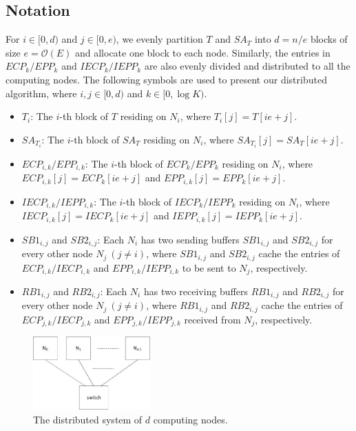 \documentclass{llncs}
\begin{document}
\subsection{Notation}

For $i\in [0,d)$ and $j\in [0,e)$, we evenly partition $T$ and $SA_T$ into $d=n/e$ blocks of size $e=\mathcal{O}(E)$ and allocate one block to each node. Similarly, the entries in $ECP_k/EPP_k$ and $IECP_k/IEPP_k$ are also evenly divided and distributed to all the computing nodes. The following symbols are used to present our distributed algorithm, where $i,j\in [0,d)$ and $k\in [0,\log K)$.

\begin{itemize}
\item $T_i$: The $i$-th block of $T$ residing on $N_i$, where $T_i[j] = T[ie+j]$.
\item $SA_{T_i}$: The $i$-th block of $SA_T$ residing on $N_i$, where $SA_{T_i}[j] = SA_T[ie+j]$.
\item $ECP_{i,k}/EPP_{i,k}$: The $i$-th block of $ECP_{k}/EPP_{k}$ residing on $N_i$, where $ECP_{i,k}[j] = ECP_k[ie+j]$ and $EPP_{i,k}[j] = EPP_k[ie+j]$.
\item $IECP_{i,k}/IEPP_{i,k}$: The $i$-th block of $IECP_{k}/IEPP_{k}$ residing on $N_i$, where $IECP_{i,k}[j] = IECP_k[ie+j]$ and $IEPP_{i,k}[j] = IEPP_k[ie+j]$.
\item $SB1_{i,j}$ and $SB2_{i,j}$: Each $N_i$ has two sending buffers $SB1_{i,j}$ and $SB2_{i,j}$ for every other node $N_j~(j\ne i)$, where $SB1_{i,j}$ and $SB2_{i,j}$ cache the entries of $ECP_{i,k}/IECP_{i,k}$ and $EPP_{i,k}/IEPP_{i,k}$ to be sent to $N_j$, respectively.
\item $RB1_{i,j}$ and $RB2_{i,j}$: Each $N_i$ has two receiving buffers $RB1_{i,j}$ and $RB2_{i,j}$ for every other node $N_j~(j\ne i)$, where $RB1_{i,j}$ and $RB2_{i,j}$ cache the entries of $ECP_{j,k}/IECP_{j,k}$ and $EPP_{j,k}/IEPP_{j,k}$ received from $N_j$, respectively.
\end{itemize}

\begin{figure}[hbtp!]
\centering
\includegraphics[width=0.4\textwidth]{distributed_system.eps}
\caption{The distributed system of $d$ computing nodes. }
\label{fig:distributed_system}
\end{figure}
\end{document}

